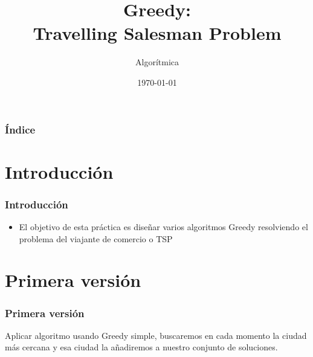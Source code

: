 \documentclass{beamer}
\title[Practica 3]{Greedy:\\
Travelling Salesman Problem} %
\author{Algorítmica} %
\institute[UGR] %
{
Universidad de Granada \\ %
\medskip

}
\date{\today} %
\begin{document}
\begin{frame}
\titlepage %
\end{frame}

\begin{frame}
\frametitle{Índice} %
\tableofcontents %
\end{frame}


\section{Introducción }
\begin{frame}
	\frametitle{Introducción}
	\begin{itemize}
		\item El objetivo de esta práctica es diseñar varios algoritmos Greedy resolviendo el problema del viajante de comercio o TSP
	\end{itemize}
\end{frame}


\section{Primera versión} 
\begin{frame}
	\frametitle{Primera versión}
	Aplicar algoritmo usando Greedy simple, buscaremos en cada momento la ciudad más cercana y esa ciudad
	la añadiremos a nuestro conjunto de soluciones. 
	
\end{frame}

\end{document}
